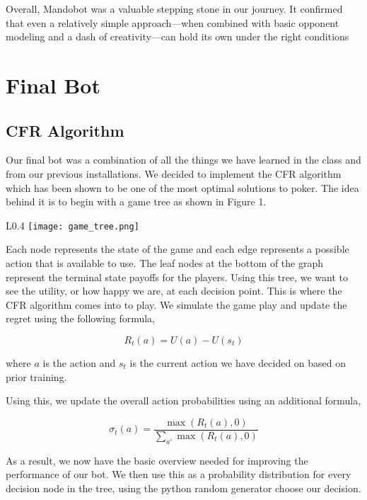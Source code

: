 \documentclass{article}
\begin{document}
    Overall, Mandobot was a valuable stepping stone in our journey. It confirmed that even a relatively simple approach—when combined with basic opponent modeling and a dash of creativity—can hold its own under the right conditions

    \pagebreak
    
    \section*{Final Bot}
   
    \subsection*{CFR Algorithm}
    Our final bot was a combination of all the things we have learned in the class and from our previous installations. We decided to implement the CFR algorithm which has been shown to be one of the most optimal solutions to poker. The idea behind it is to begin with a game tree as shown in Figure 1. 

    \begin{wrapfigure}{L}{0.4\textwidth}
    \centering
    \captionsetup{justification=centering,margin=2cm}
    \texttt{[image: game\_tree.png]}
    \caption{\label{fig:tree_diagram}}
    \end{wrapfigure}

    Each node represents the state of the game and each edge represents a possible action that is available to use. The leaf nodes at the bottom of the graph represent the terminal state payoffs for the players. Using this tree, we want to see the utility, or how happy we are, at each decision point. This is where the CFR algorithm comes into to play. We simulate the game play and update the regret using the following formula, 

    \[R_t(a) = U(a) - U(s_t)\]

    where $a$ is the action and $s_t$ is the current action we have decided on based on prior training. 
    
    Using this, we update the overall action probabilities using an additional formula, 

    \[\sigma_t(a) = \frac{\max{(R_t(a),0)}}{\sum_{a'}\max{(R_t(a),0)}}\]

    As a result, we now have the basic overview needed for improving the performance of our bot. We then use this as a probability distribution for every decision node in the tree, using the python random generator choose our decision. 
\end{document}

